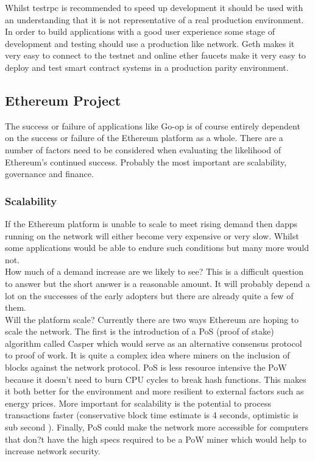 Whilst testrpc is recommended to speed up development it should be used with an understanding that it is not representative of a real production environment. In order to build applications with a good user experience some stage of development and testing should use a production like network. Geth makes it very easy to connect to the testnet and online ether faucets make it very easy to deploy and test smart contract systems in a production parity environment. \\

\subsection{Ethereum Project}
The success or failure of applications like Go-op is of course entirely dependent on the success or failure of the Ethereum platform as a whole. There are a number of factors need to be considered when evaluating the likelihood of Ethereum's continued success. Probably the most important are scalability, governance and finance.

\subsubsection{Scalability}
If the Ethereum platform is unable to scale to meet rising demand then dapps running on the network will either become very expensive or very slow. Whilst some applications would be able to endure such conditions but many more would not. \\

How much of a demand increase are we likely to see? This is a difficult question to answer but the short answer is a reasonable amount. It will probably depend a lot on the successes of the early adopters but there are already quite a few of them.\\

Will the platform scale? Currently there are two ways Ethereum are hoping to scale the network. The first is the introduction of a PoS (proof of stake) algorithm called Casper\cite{casper} which would serve as an alternative consensus protocol to proof of work. It is quite a complex idea where miners on the inclusion of blocks against the network protocol. PoS is less resource intensive the PoW because it doesn't need to burn CPU cycles to break hash functions. This makes it both better for the environment and more resilient to external factors such as energy prices. More important for scalability is the potential to process transactions faster (conservative block time estimate is 4 seconds, optimistic is sub second \cite{posTPS}). Finally, PoS could make the network more accessible for computers that don?t have the high specs required to be a PoW miner which would help to increase network security.\\

